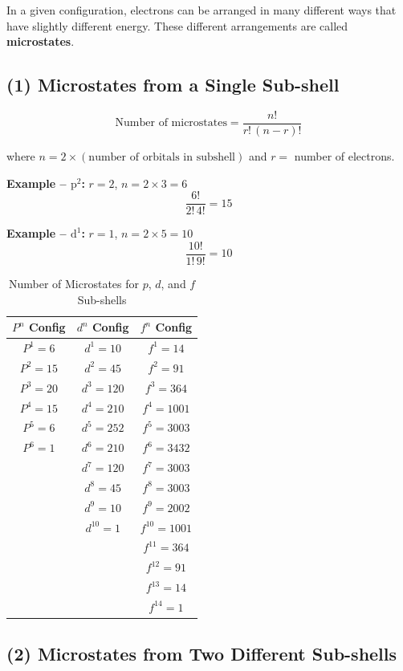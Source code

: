 \documentclass[12pt,a4paper]{article}
\begin{document}
In a given configuration, electrons can be arranged in many different ways that have slightly different energy. These different arrangements are called \textbf{microstates}.

\subsection{(1) Microstates from a Single Sub-shell}

\[
\text{Number of microstates} = \frac{n!}{r!\,(n-r)!}
\]

where $n = 2 \times (\text{number of orbitals in subshell})$ and $r = $ number of electrons.

\textbf{Example -- $\mathrm{p}^2$:} $r=2$, $n = 2\times3 = 6$
\[
\frac{6!}{2!\,4!} = 15
\]

\textbf{Example -- $\mathrm{d}^1$:} $r=1$, $n=2\times5=10$
\[
\frac{10!}{1!\,9!} = 10
\]

\begin{table}[H]
\centering
\caption{Number of Microstates for $p$, $d$, and $f$ Sub-shells}
\begin{tabular}{ccc}
\toprule
$P^n$ Config & $d^n$ Config & $f^n$ Config \\
\midrule
$P^1 = 6$  & $d^1 = 10$  & $f^1 = 14$ \\
$P^2 = 15$ & $d^2 = 45$  & $f^2 = 91$ \\
$P^3 = 20$ & $d^3 = 120$ & $f^3 = 364$ \\
$P^4 = 15$ & $d^4 = 210$ & $f^4 = 1001$ \\
$P^5 = 6$  & $d^5 = 252$ & $f^5 = 3003$ \\
$P^6 = 1$  & $d^6 = 210$ & $f^6 = 3432$ \\
           & $d^7 = 120$ & $f^7 = 3003$ \\
           & $d^8 = 45$  & $f^8 = 3003$ \\
           & $d^9 = 10$  & $f^9 = 2002$ \\
           & $d^{10} = 1$ & $f^{10} = 1001$ \\
           &             & $f^{11} = 364$ \\
           &             & $f^{12} = 91$ \\
           &             & $f^{13} = 14$ \\
           &             & $f^{14} = 1$ \\
\bottomrule
\end{tabular}
\end{table}

\subsection{(2) Microstates from Two Different Sub-shells}
\end{document}
